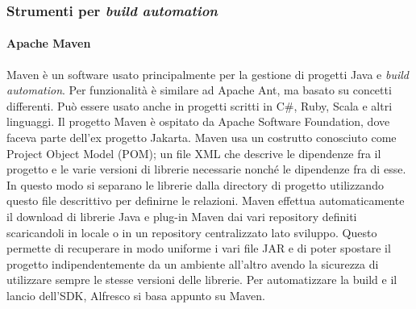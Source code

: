 \subsubsection{Strumenti per \emph{build automation}}
\paragraph{Apache Maven}
 Maven è un software usato principalmente per la gestione di progetti Java e \emph{build automation}. Per funzionalità è similare ad Apache Ant, ma basato su concetti differenti. Può essere usato anche in progetti scritti in C\#, Ruby, Scala e altri linguaggi. Il progetto Maven è ospitato da Apache Software Foundation, dove faceva parte dell'ex progetto Jakarta.
Maven usa un costrutto conosciuto come Project Object Model (POM); un file XML che descrive le dipendenze fra il progetto e le varie versioni di librerie necessarie nonché le dipendenze fra di esse. In questo modo si separano le librerie dalla directory di progetto utilizzando questo file descrittivo per definirne le relazioni.
Maven effettua automaticamente il download di librerie Java e plug-in Maven dai vari repository definiti scaricandoli in locale o in un repository centralizzato lato sviluppo. Questo permette di recuperare in modo uniforme i vari file JAR e di poter spostare il progetto indipendentemente da un ambiente all'altro avendo la sicurezza di utilizzare sempre le stesse versioni delle librerie.
Per automatizzare la build e il lancio dell'SDK, Alfresco si basa appunto su Maven.
